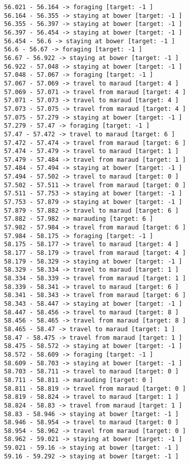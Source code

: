 \documentclass[11pt]{article}
\begin{document}
\begin{Verbatim}[commandchars=\\\{\}]
56.021 - 56.164 -> foraging [target: -1 ]
56.164 - 56.355 -> staying at bower [target: -1 ]
56.355 - 56.397 -> staying at bower [target: -1 ]
56.397 - 56.454 -> staying at bower [target: -1 ]
56.454 - 56.6 -> staying at bower [target: -1 ]
56.6 - 56.67 -> foraging [target: -1 ]
56.67 - 56.922 -> staying at bower [target: -1 ]
56.922 - 57.048 -> staying at bower [target: -1 ]
57.048 - 57.067 -> foraging [target: -1 ]
57.067 - 57.069 -> travel to maraud [target: 4 ]
57.069 - 57.071 -> travel from maraud [target: 4 ]
57.071 - 57.073 -> travel to maraud [target: 4 ]
57.073 - 57.075 -> travel from maraud [target: 4 ]
57.075 - 57.279 -> staying at bower [target: -1 ]
57.279 - 57.47 -> foraging [target: -1 ]
57.47 - 57.472 -> travel to maraud [target: 6 ]
57.472 - 57.474 -> travel from maraud [target: 6 ]
57.474 - 57.479 -> travel to maraud [target: 1 ]
57.479 - 57.484 -> travel from maraud [target: 1 ]
57.484 - 57.494 -> staying at bower [target: -1 ]
57.494 - 57.502 -> travel to maraud [target: 0 ]
57.502 - 57.511 -> travel from maraud [target: 0 ]
57.511 - 57.753 -> staying at bower [target: -1 ]
57.753 - 57.879 -> staying at bower [target: -1 ]
57.879 - 57.882 -> travel to maraud [target: 6 ]
57.882 - 57.982 -> marauding [target: 6 ]
57.982 - 57.984 -> travel from maraud [target: 6 ]
57.984 - 58.175 -> foraging [target: -1 ]
58.175 - 58.177 -> travel to maraud [target: 4 ]
58.177 - 58.179 -> travel from maraud [target: 4 ]
58.179 - 58.329 -> staying at bower [target: -1 ]
58.329 - 58.334 -> travel to maraud [target: 1 ]
58.334 - 58.339 -> travel from maraud [target: 1 ]
58.339 - 58.341 -> travel to maraud [target: 6 ]
58.341 - 58.343 -> travel from maraud [target: 6 ]
58.343 - 58.447 -> staying at bower [target: -1 ]
58.447 - 58.456 -> travel to maraud [target: 8 ]
58.456 - 58.465 -> travel from maraud [target: 8 ]
58.465 - 58.47 -> travel to maraud [target: 1 ]
58.47 - 58.475 -> travel from maraud [target: 1 ]
58.475 - 58.572 -> staying at bower [target: -1 ]
58.572 - 58.609 -> foraging [target: -1 ]
58.609 - 58.703 -> staying at bower [target: -1 ]
58.703 - 58.711 -> travel to maraud [target: 0 ]
58.711 - 58.811 -> marauding [target: 0 ]
58.811 - 58.819 -> travel from maraud [target: 0 ]
58.819 - 58.824 -> travel to maraud [target: 1 ]
58.824 - 58.83 -> travel from maraud [target: 1 ]
58.83 - 58.946 -> staying at bower [target: -1 ]
58.946 - 58.954 -> travel to maraud [target: 0 ]
58.954 - 58.962 -> travel from maraud [target: 0 ]
58.962 - 59.021 -> staying at bower [target: -1 ]
59.021 - 59.16 -> staying at bower [target: -1 ]
59.16 - 59.292 -> staying at bower [target: -1 ]

\end{Verbatim}
\end{document}
